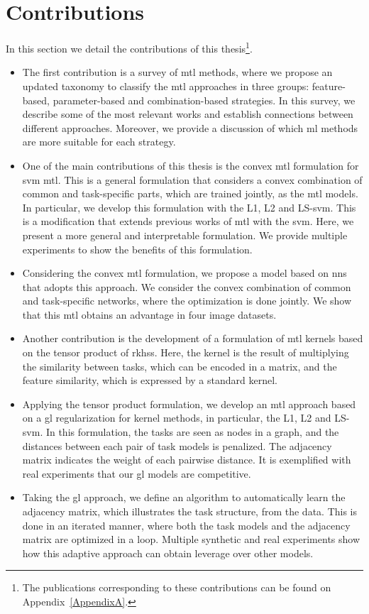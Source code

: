 \section{Contributions}
In this section we detail the contributions of this thesis\footnote{The publications corresponding to these contributions can be found on Appendix~\ref{AppendixA}.}.
\begin{itemize}
    \item The first contribution is a survey of \acrshort{mtl} methods, where we propose an updated taxonomy to classify the \acrshort{mtl} approaches in three groups: feature-based, parameter-based and combination-based strategies. In this survey, we describe some of the most relevant works and establish connections between different approaches. Moreover, we provide a discussion of which \acrshort{ml} methods are more suitable for each strategy.
    \item One of the main contributions of this thesis is the convex \acrshort{mtl} formulation for \acrshort{svm} \acrshort{mtl}. This is a general formulation that considers a convex combination of common and task-specific parts, which are trained jointly, as the \acrshort{mtl} models. In particular, we develop this formulation with the L1, L2 and LS-\acrshort{svm}. This is a modification that extends previous works of \acrshort{mtl} with the \acrshort{svm}. Here, we present a more general and interpretable formulation. We provide multiple experiments to show the benefits of this formulation.
    \item Considering the convex \acrshort{mtl} formulation, we propose a model based on \acrshort{nns} that adopts this approach. We consider the convex combination of common and task-specific networks, where the optimization is done jointly. We show that this \acrshort{mtl} obtains an advantage in four image datasets.
    \item Another contribution is the development of a formulation of \acrshort{mtl} kernels based on the tensor product of \acrshort{rkhss}. Here, the kernel is the result of multiplying the similarity between tasks, which can be encoded in a matrix, and the feature similarity, which is expressed by a standard kernel.%
    \item Applying the tensor product formulation, we develop an \acrshort{mtl} approach based on a \acrfull{gl} regularization for kernel methods, in particular, the L1, L2 and LS-\acrshort{svm}. In this formulation, the tasks are seen as nodes in a graph, and the distances between each pair of task models is penalized. The adjacency matrix indicates the weight of each pairwise distance. It is exemplified with real experiments that our \acrshort{gl} models are competitive.
    \item Taking the \acrshort{gl} approach, we define an algorithm to automatically learn the adjacency matrix, which illustrates the task structure, from the data. This is done in an iterated manner, where both the task models and the adjacency matrix are optimized in a loop. Multiple synthetic and real experiments show how this adaptive approach can obtain leverage over other models.
\end{itemize}


